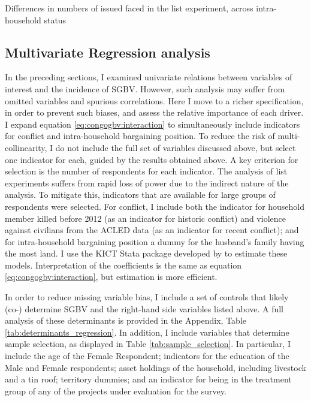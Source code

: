 \begin{table}[htb]
\centering
\caption{Differences in numbers of issued faced in the list experiment, across intra-household status}
\label{tab:meadifftab_mar}
\end{table}



\subsection{Multivariate Regression analysis}

In the preceding sections, I examined univariate relations between variables of interest and the incidence of SGBV. However, such analysis may suffer from omitted variables and spurious correlations. Here I move to a richer specification, in order to prevent such biases, and assess the relative importance of each driver. I expand equation \ref{eq:congogbv:interaction} to simultaneously include indicators for conflict and intra-household bargaining position. To reduce the risk of multi-collinearity, I do not include the full set of variables discussed above, but select one indicator for each, guided by the results obtained above. A key criterion for selection is the number of respondents for each indicator. The analysis of list experiments suffers from rapid loss of power due to the indirect nature of the analysis. To mitigate this, indicators that are available for large groups of respondents were selected. For conflict, I include both the indicator for household member killed before 2012 (as an indicator for historic conflict) and violence against civilians from the ACLED data (as an indicator for recent conflict); and for intra-household bargaining position a dummy for the husband's family having the most land. I use the KICT Stata package developed by \citet{Tsai2019} to estimate these models. Interpretation of the coefficients is the same as equation \ref{eq:congogbv:interaction}, but estimation is more efficient.

In order to reduce missing variable bias, I include a set of controls that likely (co-) determine SGBV and the right-hand side variables listed above. A full analysis of these determinants is provided in the Appendix, Table \ref{tab:determinants_regression}. In addition, I include variables that determine sample selection, as displayed in Table \ref{tab:sample_selection}. In particular, I include the age of the Female Respondent; indicators for the education of the Male and Female respondents; asset holdings of the household, including livestock and a tin roof; territory dummies; and an indicator for being in the treatment group of any of the projects under evaluation for the survey.

